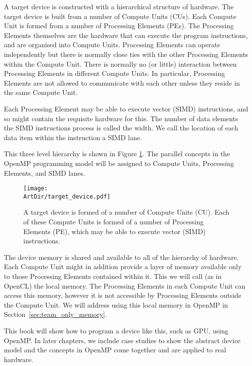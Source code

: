 A target device is constructed with a hierarchical structure of hardware.
The target device is built from a number of Compute Units (CUs).
Each Compute Unit is formed from a number of Processing Elements (PEs).
The Processing Elements themselves are the hardware that can execute the program instructions, and are organised into Compute Units.
Processing Elements can operate independently but there is normally close ties with the other Processing Elements within the Compute Unit.
There is normally no (or little) interaction between Processing Elements in different Compute Units.
In particular, Processing Elements are not allowed to communicate with each other unless they reside in the same Compute Unit.

Each Processing Element may be able to execute vector (SIMD) instructions, and so might contain the requisite hardware for this.
The number of data elements the SIMD instructions process is called the width.
We call the location of each data item within the instruction a SIMD lane.

This three level hierarchy is shown in Figure \ref{figure:target_device_hierarchy}.
The parallel concepts in the OpenMP programming model will be assigned to Compute Units, Processing Elements, and SIMD lanes.

\begin{figure}[t]
\centerline{\texttt{[image: \\ArtDir/target\_device.pdf]}}
\caption{A target device is formed of a number of Compute Units (CU). Each of these Compute Units is formed of a number of Processing Elements (PE), which may be able to execute vector (SIMD) instructions.}
\label{figure:target_device_hierarchy}
\end{figure}

The device memory is shared and available to all of the hierarchy of hardware.
Each Compute Unit might in addition provide a layer of memory available only to those Processing Elements contained within it.
This we will call (as in OpenCL) the local memory.
The Processing Elements in each Compute Unit can access this memory, however it is not accessible by Processing Elements outside the Compute Unit.
We will address using this local memory in OpenMP in Section~\ref{sec:team_only_memory}.

This book will show how to program a device like this, such as GPU, using OpenMP.
In later chapters, we include case studies to show the abstract device model and the concepts in OpenMP come together and are applied to real hardware.


